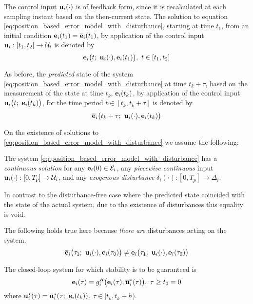 The control input $\bm{\mathbf{u}}_i(\cdot)$ is of feedback form,
since it is recalculated at each sampling instant based on the then-current
state. The solution to equation \eqref{eq:position_based_error_model_with_disturbance}, starting at time
$t_1$, from an initial condition $\bm{\mathbf{e}}_i(t_1) = \overline{\bm{\mathbf{e}}}_i(t_1)$,
by application of the control input $\bm{\mathbf{u}}_i : [t_1, t_2] \to \mathcal{U}_i$
is denoted by
\begin{align}
  \bm{\mathbf{e}}_i\big(t;\ \bm{\mathbf{u}}_i(\cdot), \bm{\mathbf{e}}_i(t_1)\big),\ t \in [t_1, t_2]
\end{align}

As before, the \textit{predicted} state of the system
\eqref{eq:position_based_error_model_with_disturbance}
at time $t_k + \tau$, based on the measurement of the state at time
$t_k$, $\bm{\mathbf{e}}_i(t_k)$, by application of the control input
$\vect{u}_i\big(t;\ \vect{e}_i(t_k)\big)$, for the time period $t \in [t_k, t_k + \tau]$
is denoted by
\begin{align}
  \overline{\bm{\mathbf{e}}}_i\big(t_k + \tau;\ \bm{\mathbf{u}}_i(\cdot), \bm{\mathbf{e}}_i(t_k)\big) \label{eq:position_based_predicted_error_0_2}
\end{align}

On the existence of solutions to
\eqref{eq:position_based_error_model_with_disturbance} we assume the following:
\begin{bw_box}
\begin{assumption}
  \label{ass:existence_of_solutions_with_disturbance}

  The system \eqref{eq:position_based_error_model_with_disturbance} has a
  \textit{continuous solution} for any $\bm{\mathbf{e}}_i(0) \in \mathcal{E}_i$,
  any \textit{piecewise continuous} input
  $\bm{\mathbf{u}}_i(\cdot) :[0,T_p] \to \mathcal{U}_i$, and any
  \textit{exogenous disturbance} $\delta_i(\cdot) : [0,T_p] \to \Delta_i$.
\end{assumption}
\end{bw_box}


In contrast to the disturbance-free case where the predicted state coincided
with the state of the actual system, due to the existence of disturbances
this equality is void.

\begin{bw_box}
\begin{remark}
  The following holds true here because \textit{there are} disturbances
  acting on the system.
  \begin{align}
    \overline{\bm{\mathbf{e}}}_i\big(\tau_1;\ \bm{\mathbf{u}}_i(\cdot), \bm{\mathbf{e}}_i(\tau_0)\big) \not=
    \bm{\mathbf{e}}_i\big(\tau_1;\ \bm{\mathbf{u}}_i(\cdot), \bm{\mathbf{e}}_i(\tau_0)\big)
    \label{eq:error_now_to_predicted_error_2}
  \end{align}
\end{remark}
\end{bw_box}

The closed-loop system for which stability is to be guaranteed is
\begin{align}
  \bm{\mathbf{e}}_i(\tau) = g_i^R\big(\bm{\mathbf{e}}_i(\tau), \overline{\bm{\mathbf{u}}}_i^{\star}(\tau)\big),\ \tau \geq t_0 = 0
  \label{eq:with_disturbances_closed_loop}
\end{align}
where $\overline{\bm{\mathbf{u}}}_i^{\star}(\tau) = \overline{\bm{\mathbf{u}}}_i^{\star}(\tau;\ \bm{\mathbf{e}}_i(t_k))$,
$\tau \in [t_k, t_k + h)$.
